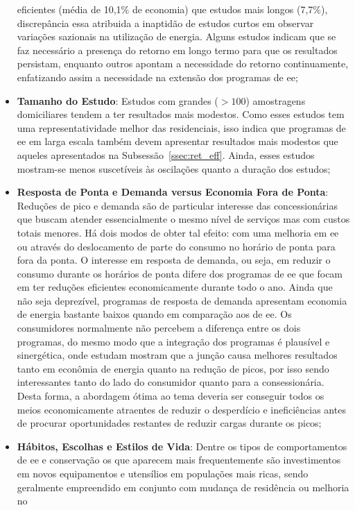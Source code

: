 \begin{itemize}
eficientes (média de 10,1\% de economia) que estudos mais longos (7,7\%),
discrepância essa atribuida a inaptidão de estudos curtos em observar variações
sazionais na utilização de energia. Alguns estudos indicam que se faz necessário 
a presença do retorno em longo termo para que os resultados persistam, 
enquanto outros apontam a necessidade do retorno continuamente, enfatizando
assim a necessidade na extensão dos programas de \gls{ee};
\item \textbf{Tamanho do Estudo}: Estudos com grandes ($> 100$) amostragens
domiciliares tendem a ter resultados mais modestos. Como esses estudos tem uma
representatividade melhor das residenciais, isso indica que programas de
\gls{ee} em larga escala também devem apresentar resultados mais modestos que
aqueles apresentados na Subsessão~\ref{ssec:ret_eff}.
Ainda, esses estudos mostram-se menos suscetíveis às oscilações 
quanto a duração dos estudos;
\item \textbf{Resposta de Ponta e Demanda versus Economia Fora de Ponta}:
Reduções de pico e demanda são de particular interesse das concessionárias que
buscam atender essencialmente o mesmo nível de serviços mas com custos totais
menores. Há dois modos de obter tal efeito: com uma melhoria em \gls{ee} ou
através do deslocamento de parte do consumo no horário de ponta para fora da
ponta. O interesse em resposta de demanda, ou seja, em reduzir o
consumo durante os horários de ponta difere dos programas de \gls{ee} que focam
em ter reduções eficientes economicamente durante todo o ano. Ainda que não seja
deprezível, programas de resposta de demanda apresentam economia de energia
bastante baixos quando em comparação aos de \gls{ee}. Os consumidores
normalmente não percebem a diferença entre os dois programas, do mesmo modo 
que a integração dos programas é plausível e sinergética, 
onde estudam mostram que a junção causa melhores resultados tanto 
em econômia de energia quanto na 
redução de picos, por isso sendo interessantes tanto do lado do consumidor 
quanto para a consessionária. Desta forma, a abordagem ótima ao tema deveria 
ser conseguir todos os meios economicamente atraentes de reduzir o desperdício 
e ineficiências antes de procurar oportunidades restantes de reduzir cargas 
durante os picos;
\item \textbf{Hábitos, Escolhas e Estilos de Vida}: Dentre os tipos de
comportamentos de \gls{ee} e conservação os que aparecem mais frequentemente são 
investimentos em novos equipamentos e utensílios em populações mais ricas, sendo
geralmente empreendido em conjunto com mudança de residência ou melhoria no

\end{itemize}
